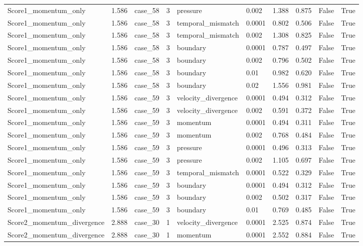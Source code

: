 \begin{longtable}{llllllllll}
Score1\_momentum\_only & 1.586 & case\_58 & 3 & pressure & 0.002 & 1.388 & 0.875 & False & True \\
Score1\_momentum\_only & 1.586 & case\_58 & 3 & temporal\_mismatch & 0.0001 & 0.802 & 0.506 & False & True \\
Score1\_momentum\_only & 1.586 & case\_58 & 3 & temporal\_mismatch & 0.002 & 1.308 & 0.825 & False & True \\
Score1\_momentum\_only & 1.586 & case\_58 & 3 & boundary & 0.0001 & 0.787 & 0.497 & False & True \\
Score1\_momentum\_only & 1.586 & case\_58 & 3 & boundary & 0.002 & 0.796 & 0.502 & False & True \\
Score1\_momentum\_only & 1.586 & case\_58 & 3 & boundary & 0.01 & 0.982 & 0.620 & False & True \\
Score1\_momentum\_only & 1.586 & case\_58 & 3 & boundary & 0.02 & 1.556 & 0.981 & False & True \\
Score1\_momentum\_only & 1.586 & case\_59 & 3 & velocity\_divergence & 0.0001 & 0.494 & 0.312 & False & True \\
Score1\_momentum\_only & 1.586 & case\_59 & 3 & velocity\_divergence & 0.002 & 0.591 & 0.372 & False & True \\
Score1\_momentum\_only & 1.586 & case\_59 & 3 & momentum & 0.0001 & 0.494 & 0.311 & False & True \\
Score1\_momentum\_only & 1.586 & case\_59 & 3 & momentum & 0.002 & 0.768 & 0.484 & False & True \\
Score1\_momentum\_only & 1.586 & case\_59 & 3 & pressure & 0.0001 & 0.496 & 0.313 & False & True \\
Score1\_momentum\_only & 1.586 & case\_59 & 3 & pressure & 0.002 & 1.105 & 0.697 & False & True \\
Score1\_momentum\_only & 1.586 & case\_59 & 3 & temporal\_mismatch & 0.0001 & 0.522 & 0.329 & False & True \\
Score1\_momentum\_only & 1.586 & case\_59 & 3 & boundary & 0.0001 & 0.494 & 0.312 & False & True \\
Score1\_momentum\_only & 1.586 & case\_59 & 3 & boundary & 0.002 & 0.502 & 0.317 & False & True \\
Score1\_momentum\_only & 1.586 & case\_59 & 3 & boundary & 0.01 & 0.769 & 0.485 & False & True \\
Score2\_momentum\_divergence & 2.888 & case\_30 & 1 & velocity\_divergence & 0.0001 & 2.525 & 0.874 & False & True \\
Score2\_momentum\_divergence & 2.888 & case\_30 & 1 & momentum & 0.0001 & 2.552 & 0.884 & False & True \\

\end{longtable}
